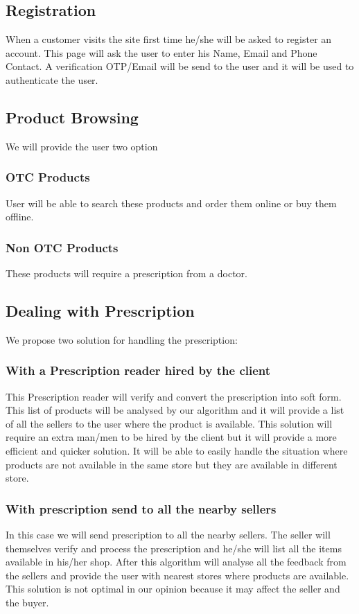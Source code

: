 \documentclass[fleqn,10pt]{../SelfArx} %
\begin{document}
\subsection{Registration}

When a customer visits the site first time he/she will be asked to register an account. This page will ask the user to enter his Name, Email and Phone Contact. A verification OTP/Email will be send to the user and it will be used to authenticate the user.

\subsection{Product Browsing}
We will provide the user two option
\subsubsection{OTC Products}
User will be able to search these products and order them online or buy them offline.
\subsubsection{Non OTC Products}
These products will require a prescription from a doctor.

\subsection{Dealing with Prescription}
We propose two solution for handling the prescription:
\subsubsection{With a Prescription reader hired by the client}
This Prescription reader will verify and convert the prescription into soft form. This list of products will be analysed by our algorithm and it will provide a list of all the sellers to the user where the product is available. This solution will require an extra man/men to be hired by the client but it will provide a more efficient and quicker solution. It will be able to easily handle the situation where products are not available in the same store but they are available in different store.
\subsubsection{With prescription send to all the nearby sellers}
In this case we will send prescription to all the nearby sellers. The seller will themselves verify and process the prescription and he/she will list all the items available in his/her shop. After this algorithm will analyse all the feedback from the sellers and provide the user with nearest stores where products are available. This solution is not optimal in our opinion because it may affect the seller and the buyer.
\end{document}
